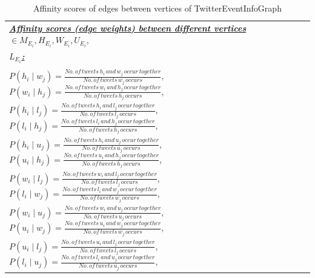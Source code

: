 \begin{table}[ht]
\caption{Affinity scores of edges between vertices of TwitterEventInfoGraph}
\label{edgescores}
\begin{tabular}{|l|}
\hline 
\underline{\textbf{\textit{Affinity scores (edge weights) between different vertices}} $\in M_{E_{i}}, H_{E_{i}}, W_{E_{i}}, U_{E_{i}},$} \\ \underline{\textbf{\textit{$L_{E_{i}}$:}}} \\ \\
$P(h_{i} \mid w_{j}) = \frac{No. \, of \, tweets \, h_{i} \, and \, w_{j} \, occur \, together}{No. \, of \, tweets \, w_{j} \, occurs}$, $P(w_{i} \mid h_{j}) = \frac{No. \, of \, tweets \, w_{i} \, and \, h_{j} \, occur \, together}{No. \, of \, tweets \, h_{j} \, occurs}$, \\


$P(h_{i} \mid l_{j}) = \frac{No. \, of \, tweets \, h_{i} \, and \, l_{j} \, occur \, together}{No. \, of \, tweets \, l_{j} \, occurs}$,
$P(l_{i} \mid h_{j}) = \frac{No. \, of \, tweets \, l_{i} \, and \, h_{j} \, occur \, together}{No. \, of \, tweets  \, h_{j} \, occurs}$, \\

$P(h_{i} \mid u_{j}) = \frac{No. \, of \, tweets  \, h_{i} \, and \, u_{j} \, occur \, together}{No. \, of \, tweets  \, u_{j} \, occurs}$,
$P(u_{i} \mid h_{j}) = \frac{No. \, of \, tweets  \, u_{i} \, and \, h_{j} \, occur \, together}{No. \, of \, tweets  \, h_{j} \, occurs}$,  \\

$P(w_{i} \mid l_{j}) = \frac{No. \, of \, tweets  \, w_{i} \, and \, l_{j} \, occur \, together}{No. \, of \, tweets  \, l_{j} \, occurs}$, 
$P(l_{i} \mid w_{j}) = \frac{No. \, of \, tweets  \, l_{i} \, and \, w_{j} \, occur \, together}{No. \, of \, tweets  \, w_{j} \, occurs}$, \\ 

$P(w_{i} \mid u_{j}) = \frac{No. \, of \, tweets  \, w_{i} \, and \, u_{j} \, occur \, together}{No. \, of \, tweets  \, u_{j} \, occurs}$,
$P(u_{i} \mid w_{j}) = \frac{No. \, of \, tweets  \, u_{i} \, and \, w_{j} \, occur \, together}{No. \, of \, tweets  \, w_{j} \, occurs}$, \\

$P(u_{i} \mid l_{j}) = \frac{No. \, of \, tweets  \, u_{i} \, and \, l_{j} \, occur \, together}{No. \, of \, tweets  \, l_{j} \, occurs}$, 
$P(l_{i} \mid u_{j}) = \frac{No. \, of \, tweets  \, l_{i} \, and \, u_{j} \, occur \, together}{No. \, of \, tweets  \, u_{j} \, occurs}$, \\



\end{tabular}
\end{table}
